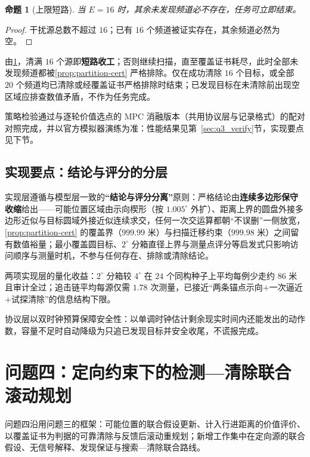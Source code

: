 \documentclass[withoutpreface]{cumcmthesis}
\newtheorem{proposition}{命题}
\begin{document}
\begin{proposition}[上限短路]\label{prop:upper-shortcut}
当 $E=16$ 时，其余未发现频道必不存在，任务可立即结束。
\end{proposition}
\begin{proof}
干扰源总数不超过 $16$；已有 $16$ 个频道被证实存在，其余频道必然为空。
\end{proof}

由\cref{prop:upper-shortcut}，清满 $16$ 个源即\textbf{短路收工}；否则继续扫描，直至覆盖证书耗尽，此时全部未发现频道都被\cref{prop:partition-cert} 严格排除。仅在成功清除 $16$ 个目标，或全部 $20$ 个频道均已清除或经覆盖证书严格排除时结束；已发现目标在未清除前出现空区域应排查数值矛盾，不作为任务完成。

策略检验通过与逐轮价值选点的 MPC 消融版本（共用协议层与记录格式）的配对对照完成，并以官方模拟器演练为准：性能结果见第~\cref{sec:q3_verify}节，实现要点见下节。

\subsection{实现要点：结论与评分的分层}

实现层遵循与模型层一致的\textbf{“结论与评分分离”}原则：严格结论由\textbf{连续多边形保守收缩}给出——可能位置区域由示向楔形（按 $1.005^\circ$ 外扩）、距离上界的圆盘外接多边形近似与目标圆域外接近似连续求交，任何一次交运算都朝“不误删”一侧放宽，\cref{prop:partition-cert} 的覆盖界（$999.99$ 米）与扫描迁移约束（$999.98$ 米）之间留有数值裕量；最小覆盖圆目标、$2^\circ$ 分箱直径上界与测量点评分等启发式只影响访问顺序与测量时机，不参与任何存在、排除或清除结论。

两项实现层的量化收益：$2^\circ$ 分箱较 $4^\circ$ 在 $24$ 个同构种子上平均每例少走约 $86$ 米且审计全过；追击链平均每源仅需 $1.78$ 次测量，已接近“两条锚点示向$+$一次逼近$+$试探清除”的信息结构下限。

协议层以双时钟预算保障安全性：以单调时钟估计剩余现实时间内还能发出的动作数，容量不足时自动降级为只追已发现目标并安全收尾，不谎报完成。

\section{问题四：定向约束下的检测—清除联合滚动规划}\label{sec:q4}

问题四沿用问题三的框架：可能位置的联合假设更新、计入行进距离的价值评价、以覆盖证书为判据的可靠清除与反馈后滚动重规划；新增工作集中在定向源的联合假设、无信号解释、发现保证与搜索—清除联合路线。
\end{document}
